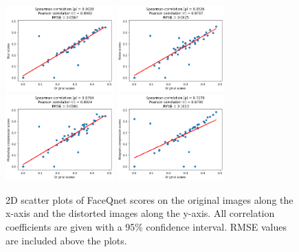 \begin{figure}[H]
\centering
    \subfloat
        {\includegraphics[width=0.37\textwidth]{figures/FaceQnetBlur.png}}
    \subfloat
        {\includegraphics[width=0.37\textwidth]{figures/FaceQnetNoise.png}}
        \quad
    \subfloat
        {\includegraphics[width=0.37\textwidth]{figures/FaceQnetPhotoshop.png}}
    \subfloat
        {\includegraphics[width=0.37\textwidth]{figures/FaceQnetTelegram.png}}
    \caption{2D scatter plots of FaceQnet scores on the original images along the x-axis and the distorted images along the y-axis. All correlation coefficients are given with a 95\% confidence interval. RMSE values are included above the plots.}
    \label{fig:NFCFaceCorr}
\end{figure}

